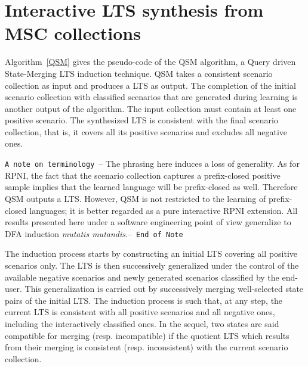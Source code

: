 \section{Interactive LTS synthesis from MSC collections\label{section:lts-induction-from-mscs}}

Algorithm~\ref{QSM} gives the pseudo-code of the \textsc{QSM} algorithm, a Query driven State-Merging LTS induction technique. \textsc{QSM} takes a consistent scenario collection as input and produces a LTS as output. The completion of the initial scenario collection with classified scenarios that are generated during learning is another output of the algorithm. The input collection must contain at least one positive scenario. The synthesized LTS is consistent with the final scenario collection, that is, it covers all its positive scenarios and excludes all negative ones.

\texttt{A note on terminology}~-- The phrasing here induces a loss of generality. As for RPNI, the fact that the scenario collection captures a prefix-closed positive sample implies that the learned language will be prefix-closed as well. Therefore QSM outputs a LTS. However, QSM is not restricted to the learning of prefix-closed languages; it is better regarded as a pure interactive RPNI extension. All results presented here under a software engineering point of view generalize to DFA induction \emph{mutatis mutandis}.--~\texttt{End of Note}

The induction process starts by constructing an initial LTS covering all positive scenarios only. The LTS is then successively generalized under the control of the available negative scenarios and newly generated scenarios classified by the end-user. This generalization is carried out by successively merging well-selected state pairs of the initial LTS. The induction process is such that, at any step, the current LTS is consistent with all positive scenarios and all negative ones, including the interactively classified ones. In the sequel, two states are said compatible for merging (resp. incompatible) if the quotient LTS which results from their merging is consistent (resp. inconsistent) with the current scenario collection.

